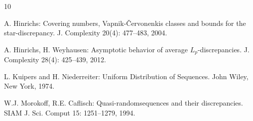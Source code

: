 \documentclass[12pt]{article}
\theoremstyle{remark}
\theoremstyle{definition}
\newcommand{\<}{\langle}
\renewcommand{\>}{\rangle}
\begin{document}
\begin{thebibliography}{10}

 A. Hinrichs: Covering numbers, Vapnik-\v{C}ervonenkis classes and bounds for the star-discrepancy. J. Complexity 20(4): 477--483, 2004. 




 A. Hinrichs, H. Weyhausen: Asymptotic behavior of average $L_p$-discrepancies. J. Complexity 28(4): 425--439, 2012.






 L. Kuipers and H. Niederreiter: Uniform Distribution of Sequences. John Wiley, New York, 1974.




 W.J. Morokoff, R.E. Caflisch: Quasi-randomsequences and their discrepancies. SIAM J. Sci. Comput 15: 1251--1279, 1994.


\end{thebibliography}
\end{document}
